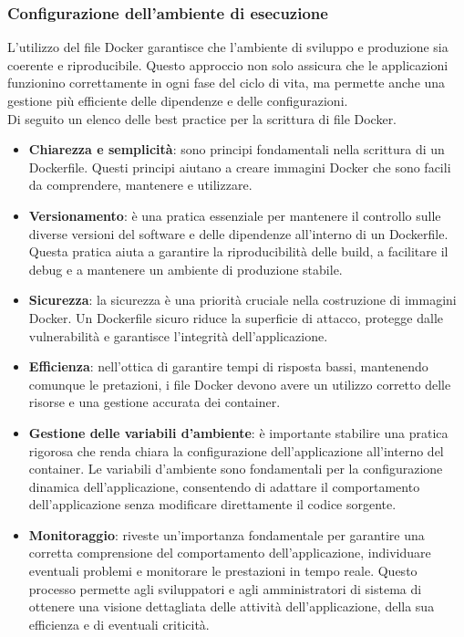 \subsubsection{Configurazione dell'ambiente di esecuzione}
L'utilizzo del file Docker garantisce che l'ambiente di sviluppo e produzione sia coerente e riproducibile. Questo approccio non solo assicura che le applicazioni funzionino correttamente in ogni fase del ciclo di vita, ma permette anche una gestione più efficiente delle dipendenze e delle configurazioni.\\
Di seguito un elenco delle best practice per la scrittura di file Docker.
\begin{itemize}
	\item \textbf{Chiarezza e semplicità}: sono principi fondamentali nella scrittura di un Dockerfile. Questi principi aiutano a creare immagini Docker che sono facili da comprendere, mantenere e utilizzare.
	\item \textbf{Versionamento}: è una pratica essenziale per mantenere il controllo sulle diverse versioni del software e delle dipendenze all'interno di un Dockerfile. Questa pratica aiuta a garantire la riproducibilità delle build, a facilitare il debug e a mantenere un ambiente di produzione stabile.
	\item \textbf{Sicurezza}: la sicurezza è una priorità cruciale nella costruzione di immagini Docker. Un Dockerfile sicuro riduce la superficie di attacco, protegge dalle vulnerabilità e garantisce l'integrità dell'applicazione.
	\item \textbf{Efficienza}: nell'ottica di garantire tempi di risposta bassi, mantenendo comunque le pretazioni, i file Docker devono avere un utilizzo corretto delle risorse e una gestione accurata dei container.
	\item \textbf{Gestione delle variabili d'ambiente}: è importante stabilire una pratica rigorosa che renda chiara la configurazione dell'applicazione all'interno del container. Le variabili d'ambiente sono fondamentali per la configurazione dinamica dell'applicazione, consentendo di adattare il comportamento dell'applicazione senza modificare direttamente il codice sorgente.
	\item \textbf{Monitoraggio}: riveste un'importanza fondamentale per garantire una corretta comprensione del comportamento dell'applicazione, individuare eventuali problemi e monitorare le prestazioni in tempo reale. Questo processo permette agli sviluppatori e agli amministratori di sistema di ottenere una visione dettagliata delle attività dell'applicazione, della sua efficienza e di eventuali criticità.

\end{itemize}
